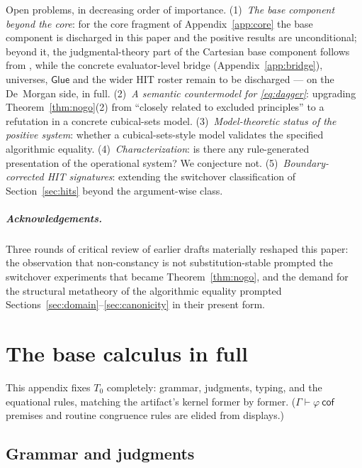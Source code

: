 \documentclass{lmcs}
\newcommand{\Glue}{\mathsf{Glue}}
\begin{document}
Open problems, in decreasing order of importance.
(1)~\emph{The base component beyond the core}: for the core fragment
of Appendix~\ref{app:core} the base component is discharged in this
paper and the positive results are unconditional; beyond it, the
judgmental-theory part of the Cartesian base component follows from
\cite{SterlingAngiuli}, while the concrete evaluator-level bridge
(Appendix~\ref{app:bridge}), universes, $\Glue$ and the wider HIT
roster remain to be discharged --- on the De~Morgan side, in full.
(2)~\emph{A semantic countermodel for \eqref{eq:dagger}}: upgrading
Theorem~\ref{thm:nogo}(2) from ``closely related to excluded
principles'' to a refutation in a concrete cubical-sets model.
(3)~\emph{Model-theoretic status of the positive system}: whether a
cubical-sets-style model validates the specified algorithmic
equality.
(4)~\emph{Characterization}: is there any rule-generated presentation
of the operational system?  We conjecture not.
(5)~\emph{Boundary-corrected HIT signatures}: extending the
switchover classification of Section~\ref{sec:hits} beyond the
argument-wise class.

\subparagraph*{Acknowledgements.}  Three rounds of critical review of
earlier drafts materially reshaped this paper: the observation that
non-constancy is not substitution-stable prompted the switchover
experiments that became Theorem~\ref{thm:nogo}, and the demand for
the structural metatheory of the algorithmic equality prompted
Sections~\ref{sec:domain}--\ref{sec:canonicity} in their present
form.

\appendix

\section{The base calculus in full}
\label{app:rules}

This appendix fixes $T_0$ completely: grammar, judgments, typing,
and the equational rules, matching the artifact's kernel former by
former.  ($\Gamma \vdash \varphi\ \mathsf{cof}$ premises and routine
congruence rules are elided from displays.)

\subsection{Grammar and judgments}
\end{document}
